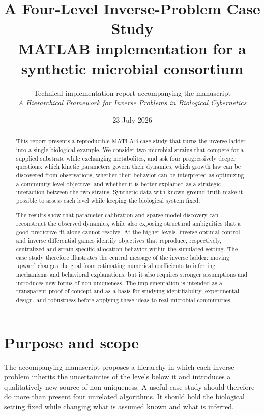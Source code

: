 \documentclass[11pt,a4paper]{article}
\title{\textbf{A Four-Level Inverse-Problem Case Study}\\
\large MATLAB implementation for a synthetic microbial consortium}
\author{Technical implementation report accompanying the manuscript\\
\emph{A Hierarchical Framework for Inverse Problems in Biological Cybernetics}}
\date{23 July 2026}
\begin{document}
\maketitle

\begin{abstract}
This report presents a reproducible MATLAB case study that turns the inverse
ladder into a single biological example. We consider two microbial strains that
compete for a supplied substrate while exchanging metabolites, and ask four
progressively deeper questions: which kinetic parameters govern their dynamics,
which growth law can be discovered from observations, whether their behavior
can be interpreted as optimizing a community-level objective, and whether it
is better explained as a strategic interaction between the two strains.
Synthetic data with known ground truth make it possible to assess each level
while keeping the biological system fixed.

The results show that parameter calibration and sparse model discovery can
reconstruct the observed dynamics, while also exposing structural ambiguities
that a good predictive fit alone cannot resolve. At the higher levels, inverse
optimal control and inverse differential games identify objectives that
reproduce, respectively, centralized and strain-specific allocation behavior
within the simulated setting. The case study therefore illustrates the central
message of the inverse ladder: moving upward changes the goal from estimating
numerical coefficients to inferring mechanisms and behavioral explanations,
but it also requires stronger assumptions and introduces new forms of
non-uniqueness. The implementation is intended as a transparent proof of
concept and as a basis for studying identifiability, experimental design, and
robustness before applying these ideas to real microbial communities.
\end{abstract}

\tableofcontents
\clearpage

\section{Purpose and scope}

The accompanying manuscript \cite{BangaVillaverde2026} proposes a hierarchy in
which each inverse problem inherits the uncertainties of the levels below it
and introduces a qualitatively new source of non-uniqueness. A useful case
study should therefore do more than present four unrelated algorithms. It
should hold the biological setting fixed while changing what is assumed known
and what is inferred.
\end{document}
